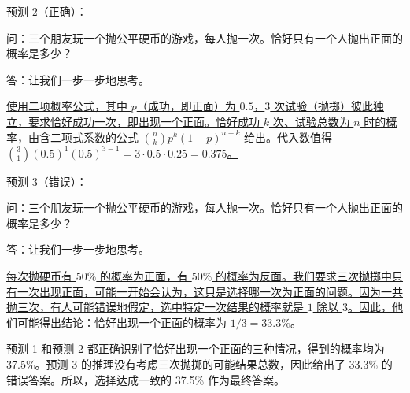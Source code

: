 \vspace{0.5em}
预测 2（正确）：
\begin{tcolorbox}

\begingroup
\setlength{\leftskip}{2em}
\setlength{\rightskip}{2em}

问：三个朋友玩一个抛公平硬币的游戏，每人抛一次。恰好只有一个人抛出正面的概率是多少？

\vspace{0.5em}

答：让我们一步一步地思考。

\vspace{0.2em}

\uline{使用二项概率公式，其中 $p$（成功，即正面）为 $0.5$，$3$ 次试验（抛掷）彼此独立，要求恰好成功一次，即出现一个正面。恰好成功 $k$ 次、试验总数为 $n$ 时的概率，由含二项式系数的公式 $\binom{n}{k} p^k (1-p)^{n-k}$ 给出。代入数值得 $\binom{3}{1} (0.5)^1 (0.5)^{3-1} = 3 \cdot 0.5 \cdot 0.25 = 0.375$。}

\endgroup

\end{tcolorbox}
\vspace{0.5em}

\vspace{0.5em}
预测 3（错误）：
\begin{tcolorbox}

\begingroup
\setlength{\leftskip}{2em}
\setlength{\rightskip}{2em}

问：三个朋友玩一个抛公平硬币的游戏，每人抛一次。恰好只有一个人抛出正面的概率是多少？

\vspace{0.5em}

答：让我们一步一步地思考。

\vspace{0.2em}

\uline{每次抛硬币有 $50\%$ 的概率为正面，有 $50\%$ 的概率为反面。我们要求三次抛掷中只有一次出现正面，可能一开始会认为，这只是选择哪一次为正面的问题。因为一共抛三次，有人可能错误地假定，选中特定一次结果的概率就是 $1$ 除以 $3$。因此，他们可能得出结论：恰好出现一个正面的概率为 $1/3=33.3\%$。}

\endgroup

\end{tcolorbox}
\vspace{0.5em}

预测 1 和预测 2 都正确识别了恰好出现一个正面的三种情况，得到的概率均为 37.5\%。预测 3 的推理没有考虑三次抛掷的可能结果总数，因此给出了 33.3\% 的错误答案。所以，选择达成一致的 37.5\% 作为最终答案。

